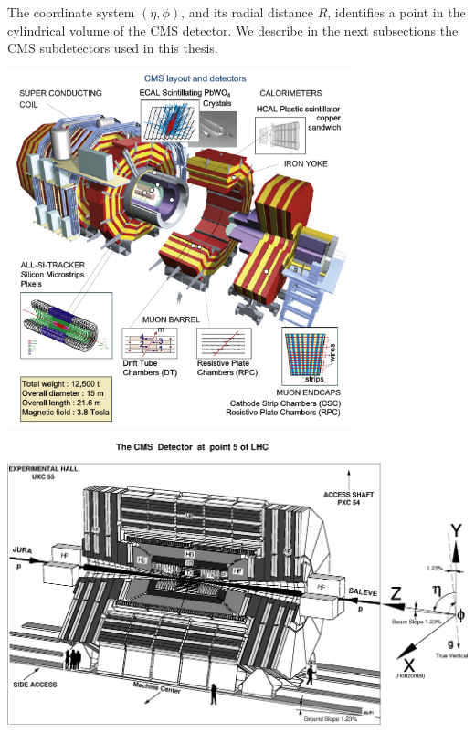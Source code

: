 The coordinate system $(\eta, \phi)$, and its radial distance $R$, identifies a point in the cylindrical volume of the CMS detector. We describe in the next subsections the CMS subdetectors used in this thesis.
\begin{center}
\centering
\mbox{\includegraphics[width=10cm]{THESISPLOTS/CMS_LAYOUT_AND_DETECTORS.png}} 
\label{fig:CMS-DET}
\end{center}

\begin{center}
\centering
\mbox{\includegraphics[scale=0.5]{THESISPLOTS/CMS_DETECTOR.eps}} 
\label{fig:CMSDCORD}
\end{center}

